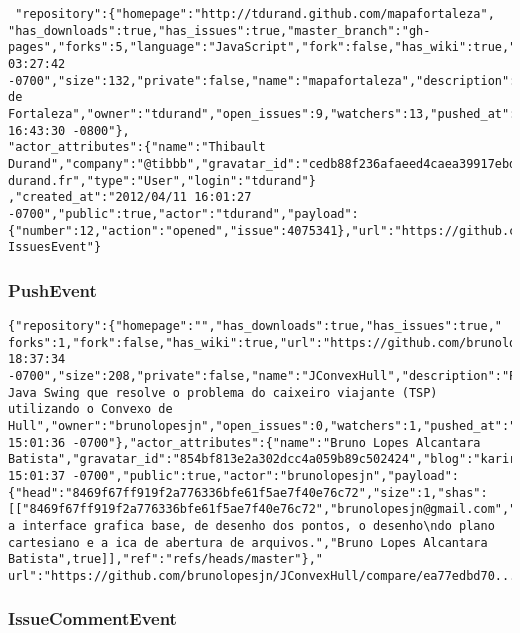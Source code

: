 \documentclass[a4paper,10pt]{article}
\begin{document}
\begin{lstlisting}
 "repository":{"homepage":"http://tdurand.github.com/mapafortaleza",
"has_downloads":true,"has_issues":true,"master_branch":"gh-pages","forks":5,"language":"JavaScript","fork":false,"has_wiki":true,"url":"https://github.com/tdurand/mapafortaleza","created_at":"2011/09/29 03:27:42 -0700","size":132,"private":false,"name":"mapafortaleza","description":"Mapa de Fortaleza","owner":"tdurand","open_issues":9,"watchers":13,"pushed_at":"2012/02/29 16:43:30 -0800"},
"actor_attributes":{"name":"Thibault Durand","company":"@tibbb","gravatar_id":"cedb88f236afaeed4caea39917ebd0a7","blog":"http://www.thibault-durand.fr","type":"User","login":"tdurand"}
,"created_at":"2012/04/11 16:01:27 -0700","public":true,"actor":"tdurand","payload":{"number":12,"action":"opened","issue":4075341},"url":"https://github.com/tdurand/mapafortaleza/issues/12","type":"
IssuesEvent"}
\end{lstlisting}

\subsubsection{PushEvent}

\begin{lstlisting}
{"repository":{"homepage":"","has_downloads":true,"has_issues":true,"
forks":1,"fork":false,"has_wiki":true,"url":"https://github.com/brunolopesjn/JConvexHull","created_at":"2012/04/10 18:37:34 -0700","size":208,"private":false,"name":"JConvexHull","description":"Programa Java Swing que resolve o problema do caixeiro viajante (TSP) utilizando o Convexo de Hull","owner":"brunolopesjn","open_issues":0,"watchers":1,"pushed_at":"2012/04/11 15:01:36 -0700"},"actor_attributes":{"name":"Bruno Lopes Alcantara Batista","gravatar_id":"854bf813e2a302dcc4a059b89c502424","blog":"kariridev.blogspot.com","type":"User","login":"brunolopesjn","email":"brunolopesjn@gmail.com"},"created_at":"2012/04/11 15:01:37 -0700","public":true,"actor":"brunolopesjn","payload":{"head":"8469f67ff919f2a776336bfe61f5ae7f40e76c72","size":1,"shas":[["8469f67ff919f2a776336bfe61f5ae7f40e76c72","brunolopesjn@gmail.com","Criado a interface grafica base, de desenho dos pontos, o desenho\ndo plano cartesiano e a ica de abertura de arquivos.","Bruno Lopes Alcantara Batista",true]],"ref":"refs/heads/master"},"
url":"https://github.com/brunolopesjn/JConvexHull/compare/ea77edbd70...8469f67ff9","type":"PushEvent"}
\end{lstlisting}

\subsubsection{IssueCommentEvent}
\begin{lstlisting}

\end{lstlisting}
\end{document}

